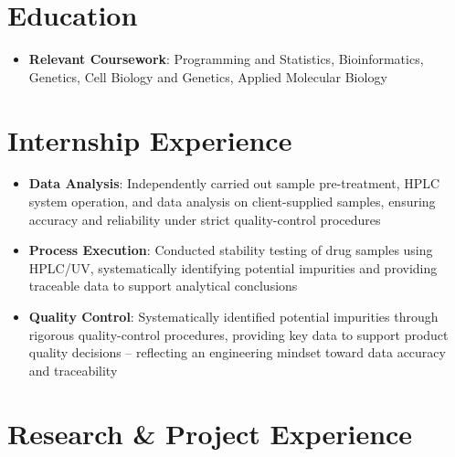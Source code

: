 \documentclass{my-resume}
\begin{document}


\section{Education}
\begin{itemize}[parsep=0.2ex]
  \item \textbf{Relevant Coursework}: Programming and Statistics, Bioinformatics, Genetics, Cell Biology and Genetics, Applied Molecular Biology
\end{itemize}

\section{Internship Experience}
\begin{itemize}[parsep=0.2ex]
  \item \textbf{Data Analysis}: Independently carried out sample pre-treatment, HPLC system operation, and data analysis on client-supplied samples, ensuring accuracy and reliability under strict quality-control procedures
  \item \textbf{Process Execution}: Conducted stability testing of drug samples using HPLC/UV, systematically identifying potential impurities and providing traceable data to support analytical conclusions
  \item \textbf{Quality Control}: Systematically identified potential impurities through rigorous quality-control procedures, providing key data to support product quality decisions -- reflecting an engineering mindset toward data accuracy and traceability
\end{itemize}

\section{Research \& Project Experience}
\end{document}
